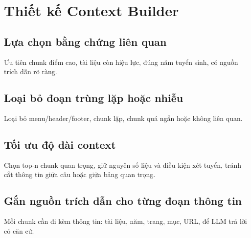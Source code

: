 ﻿\section{Thiết kế Context Builder}

\subsection{Lựa chọn bằng chứng liên quan}

Ưu tiên chunk điểm cao, tài liệu còn hiệu lực, đúng năm tuyển sinh, có nguồn trích dẫn rõ ràng.

\subsection{Loại bỏ đoạn trùng lặp hoặc nhiễu}

Loại bỏ menu/header/footer, chunk lặp, chunk quá ngắn hoặc không liên quan.

\subsection{Tối ưu độ dài context}

Chọn top-n chunk quan trọng, giữ nguyên số liệu và điều kiện xét tuyển, tránh cắt thông tin giữa câu hoặc giữa bảng quan trọng.

\subsection{Gắn nguồn trích dẫn cho từng đoạn thông tin}

Mỗi chunk cần đi kèm thông tin: tài liệu, năm, trang, mục, URL, để LLM trả lời có căn cứ.
